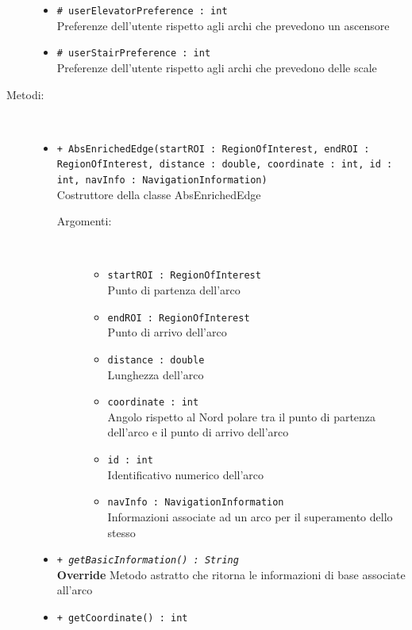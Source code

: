 \documentclass[../DefinizioneDiProdotto.tex]{subfiles}
\begin{document}
\begin{description}
\begin{itemize}
		\item \texttt{\# userElevatorPreference : int}\\
		Preferenze dell'utente rispetto agli archi che prevedono un ascensore
		
		\item \texttt{\# userStairPreference : int}\\
		Preferenze dell'utente rispetto agli archi che prevedono delle scale
		
	\end{itemize}
	\item[Metodi:] \
	\begin{itemize}
		\item \texttt{+ AbsEnrichedEdge(startROI : RegionOfInterest, endROI : RegionOfInterest, distance : double, coordinate : int, id : int, navInfo : NavigationInformation)}\\
		Costruttore della classe AbsEnrichedEdge
		\begin{description}
			\item[Argomenti:] \
			\begin{itemize}
				\item \texttt{startROI : RegionOfInterest}\\
				Punto di partenza dell'arco\item \texttt{endROI : RegionOfInterest}\\
				Punto di arrivo dell'arco\item \texttt{distance : double}\\
				Lunghezza dell'arco\item \texttt{coordinate : int}\\
				Angolo rispetto al Nord polare tra il punto di partenza dell'arco e il punto di arrivo dell'arco\item \texttt{id : int}\\
				Identificativo numerico dell'arco\item \texttt{navInfo : NavigationInformation}\\
				Informazioni associate ad un arco per il superamento dello stesso\end{itemize}
		\end{description}
		\item \texttt{+ \textit{getBasicInformation() : String}}\\
		\textbf{Override} Metodo astratto che ritorna le informazioni di base associate all'arco
		\item \texttt{+ getCoordinate() : int}\\

\end{itemize}
\end{description}
\end{document}
